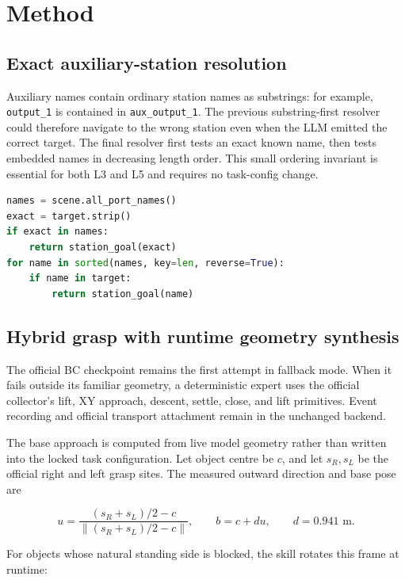 \documentclass[11pt,a4paper]{article}
\begin{document}
\section{Method}

\subsection{Exact auxiliary-station resolution}

Auxiliary names contain ordinary station names as substrings: for example, \texttt{output\_1} is contained in \texttt{aux\_output\_1}. The previous substring-first resolver could therefore navigate to the wrong station even when the LLM emitted the correct target. The final resolver first tests an exact known name, then tests embedded names in decreasing length order. This small ordering invariant is essential for both L3 and L5 and requires no task-config change.

\begin{lstlisting}[language=Python,caption={Exact-first station resolution in the editable skill layer.}]
names = scene.all_port_names()
exact = target.strip()
if exact in names:
    return station_goal(exact)
for name in sorted(names, key=len, reverse=True):
    if name in target:
        return station_goal(name)
\end{lstlisting}

\subsection{Hybrid grasp with runtime geometry synthesis}

The official BC checkpoint remains the first attempt in fallback mode. When it fails outside its familiar geometry, a deterministic expert uses the official collector's lift, XY approach, descent, settle, close, and lift primitives. Event recording and official transport attachment remain in the unchanged backend.

The base approach is computed from live model geometry rather than written into the locked task configuration. Let object centre be $c$, and let $s_R,s_L$ be the official right and left grasp sites. The measured outward direction and base pose are

\begin{equation}
u = \frac{(s_R+s_L)/2-c}{\lVert (s_R+s_L)/2-c \rVert},\qquad
b = c + d u,\qquad d=0.941\text{ m}.
\end{equation}

For objects whose natural standing side is blocked, the skill rotates this frame at runtime:
\end{document}

